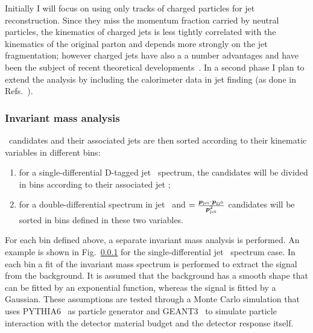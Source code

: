 \documentclass[12pt, a4paper, twoside, titlepage]{article}
\begin{document}

Initially I will focus on using only tracks of charged particles for jet reconstruction. Since they miss the momentum
fraction carried by neutral particles, the kinematics of charged jets is less tightly correlated with the kinematics
of the original parton and depends more strongly on the jet fragmentation; however charged jets have also a a number advantages
and have been the subject of recent theoretical developments~\cite{}.
In a second phase I plan to extend the analysis by including the calorimeter data in jet finding (as done in Refs.~\cite{}).

\subsubsection{Invariant mass analysis}
\Dzero\ candidates and their associated jets are then sorted according to their kinematic variables in different bins:
\begin{enumerate}
\item for a single-differential D-tagged jet \pt\ spectrum, the candidates will be divided in bins according to their associated jet \pt;
\item for a double-differential spectrum in jet \pt\ and \zpar$=\frac{\bm{p}_{\rm jet}\cdot{\bm{p}}_{\rm D^0}}{\bm{p}_{\rm jet}^2}$ candidates will
be sorted in bins defined in these two variables.
\end{enumerate}
For each bin defined above, a separate invariant mass analysis is performed. An example is shown in Fig.~\ref{} for the single-differential
jet \pt\ spectrum case. 
In each bin a fit of the invariant mass spectrum is performed to extract the signal from the background. It is assumed that the background has
a smooth shape that can be fitted by an exponential function, whereas the signal is fitted by a Gaussian. These assumptions are tested
through a Monte Carlo simulation that uses PYTHIA6~\cite{} as particle generator and GEANT3~\cite{} to simulate particle interaction
with the detector material budget and the detector response itself.
\end{document}
